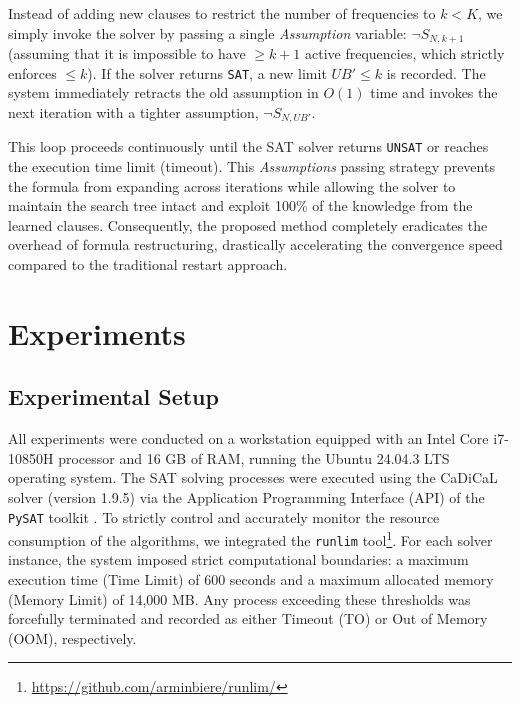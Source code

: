 \documentclass[letterpaper,journal]{IEEEtran}
\begin{document}
Instead of adding new clauses to restrict the number of frequencies to $k < K$, we simply invoke the solver by passing a single \textit{Assumption} variable: $\neg S_{N, k+1}$ (assuming that it is impossible to have $\ge k+1$ active frequencies, which strictly enforces $\le k$). If the solver returns \texttt{SAT}, a new limit $UB' \le k$ is recorded. The system immediately retracts the old assumption in $O(1)$ time and invokes the next iteration with a tighter assumption, $\neg S_{N, UB'}$. 

This loop proceeds continuously until the SAT solver returns \texttt{UNSAT} or reaches the execution time limit (timeout). This \textit{Assumptions} passing strategy prevents the formula from expanding across iterations while allowing the solver to maintain the search tree intact and exploit 100\% of the knowledge from the learned clauses. Consequently, the proposed method completely eradicates the overhead of formula restructuring, drastically accelerating the convergence speed compared to the traditional restart approach.


\section{Experiments}
\label{sec:exp}
\subsection{Experimental Setup}

All experiments were conducted on a workstation equipped with an Intel Core i7-10850H processor and 16 GB of RAM, running the Ubuntu 24.04.3 LTS operating system. The SAT solving processes were executed using the CaDiCaL solver (version 1.9.5) via the Application Programming Interface (API) of the \texttt{PySAT} toolkit \cite{imms-sat18,itk-sat24}. To strictly control and accurately monitor the resource consumption of the algorithms, we integrated the \texttt{runlim} tool\footnote{\url{https://github.com/arminbiere/runlim/}}. For each solver instance, the system imposed strict computational boundaries: a maximum execution time (Time Limit) of 600 seconds and a maximum allocated memory (Memory Limit) of 14,000 MB. Any process exceeding these thresholds was forcefully terminated and recorded as either Timeout (TO) or Out of Memory (OOM), respectively.
\end{document}
